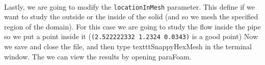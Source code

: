 \paragraph{}Lastly, we are going to modify the \texttt{locationInMesh} parameter. This define if we want to study the outside or the inside of the solid (and so we mesh the specified region of the domain). For this case we are going to study the flow inside the pipe so we put a point inside it (\texttt{(2.522222332 1.2324 0.0343)} is a good point) Now we save and close the file, and then type texttt{SnappyHexMesh} in the terminal window. The we can view the results by opening paraFoam.
